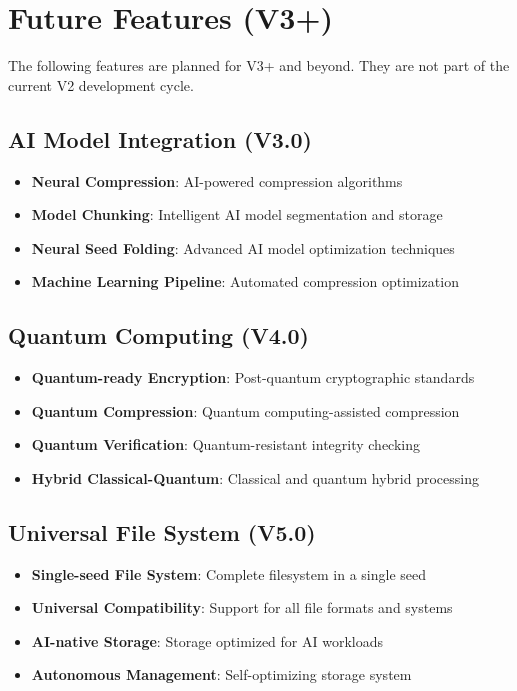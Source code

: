 \documentclass[12pt,a4paper]{article}
\begin{document}
\section{Future Features (V3+)}

\begin{tcolorbox}[colback=v3green!10,colframe=v3green!50,title=\textbf{Not Yet in V2 - Future Roadmap}]
The following features are planned for V3+ and beyond. They are not part of the current V2 development cycle.
\end{tcolorbox}

\subsection{AI Model Integration (V3.0)}
\begin{itemize}
    \item \textbf{Neural Compression}: AI-powered compression algorithms
    \item \textbf{Model Chunking}: Intelligent AI model segmentation and storage
    \item \textbf{Neural Seed Folding}: Advanced AI model optimization techniques
    \item \textbf{Machine Learning Pipeline}: Automated compression optimization
\end{itemize}

\subsection{Quantum Computing (V4.0)}
\begin{itemize}
    \item \textbf{Quantum-ready Encryption}: Post-quantum cryptographic standards
    \item \textbf{Quantum Compression}: Quantum computing-assisted compression
    \item \textbf{Quantum Verification}: Quantum-resistant integrity checking
    \item \textbf{Hybrid Classical-Quantum}: Classical and quantum hybrid processing
\end{itemize}

\subsection{Universal File System (V5.0)}
\begin{itemize}
    \item \textbf{Single-seed File System}: Complete filesystem in a single seed
    \item \textbf{Universal Compatibility}: Support for all file formats and systems
    \item \textbf{AI-native Storage}: Storage optimized for AI workloads
    \item \textbf{Autonomous Management}: Self-optimizing storage system
\end{itemize}
\end{document}
